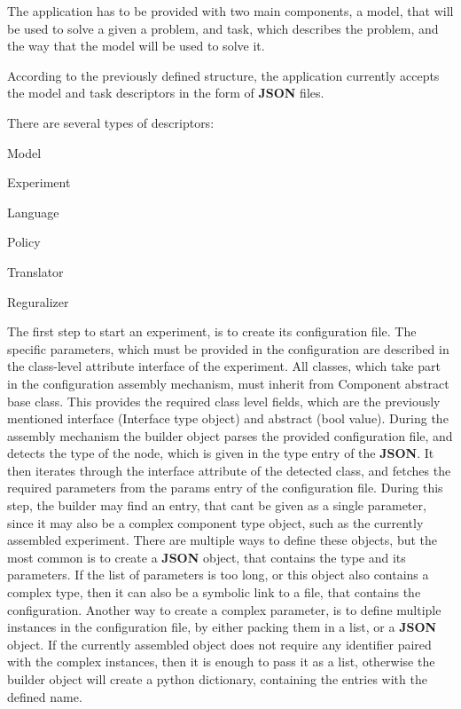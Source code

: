 The application has to be provided with two main components, a model, that will be used to solve a given a problem, and task, which describes the problem, and the way that the model will be used to solve it.

According to the previously defined structure, the application currently accepts the model and task descriptors in the form of {\bfseries J\+S\+ON} files.

There are several types of descriptors\+:


\begin{DoxyEnumerate}
\item Model
\item Experiment
\item Language
\item Policy
\item Translator
\item Reguralizer
\end{DoxyEnumerate}

The first step to start an experiment, is to create it\textquotesingle{}s configuration file. The specific parameters, which must be provided in the configuration are described in the class-\/level attribute {\ttfamily interface} of the experiment. All classes, which take part in the configuration assembly mechanism, must inherit from {\ttfamily Component} abstract base class. This provides the required class level fields, which are the previously mentioned {\ttfamily interface} ({\ttfamily Interface} type object) and {\ttfamily abstract} (bool value). During the assembly mechanism the builder object parses the provided configuration file, and detects the type of the node, which is given in the {\ttfamily type} entry of the {\bfseries J\+S\+ON}. It then iterates through the {\ttfamily interface} attribute of the detected class, and fetches the required parameters from the {\ttfamily params} entry of the configuration file. During this step, the builder may find an entry, that can\textquotesingle{}t be given as a single parameter, since it may also be a complex component type object, such as the currently assembled experiment. There are multiple ways to define these objects, but the most common is to create a {\bfseries J\+S\+ON} object, that contains the type and its parameters. If the list of parameters is too long, or this object also contains a complex type, then it can also be a symbolic link to a file, that contains the configuration. Another way to create a complex parameter, is to define multiple instances in the configuration file, by either packing them in a list, or a {\bfseries J\+S\+ON} object. If the currently assembled object does not require any identifier paired with the complex instances, then it is enough to pass it as a list, otherwise the builder object will create a python dictionary, containing the entries with the defined name.

